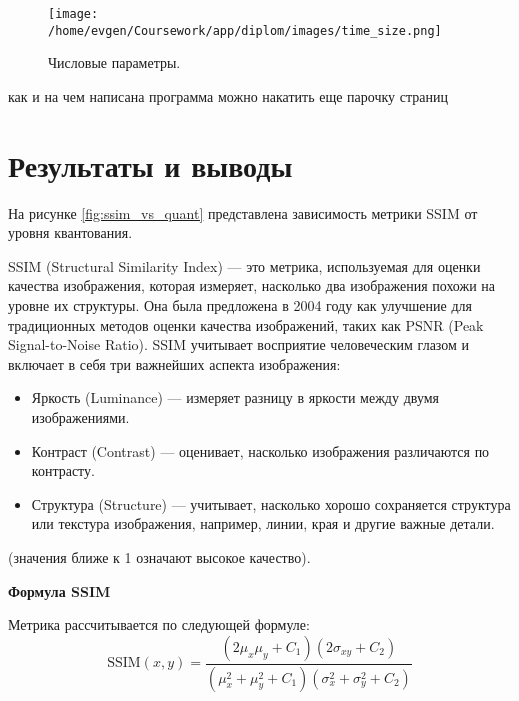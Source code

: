 \begin{figure}[h!]
    \centering
    \texttt{[image: /home/evgen/Coursework/app/diplom/images/time\_size.png]}
    \caption{Числовые параметры.}
    \label{fig:time_size}
\end{figure}

как и на чем написана программа можно накатить еще парочку страниц



\clearpage
\section{Результаты и выводы}


На рисунке \ref{fig:ssim_vs_quant} представлена зависимость метрики SSIM от уровня квантования. 

SSIM (Structural Similarity Index) — это метрика, используемая для оценки качества изображения, 
которая измеряет, насколько два изображения похожи на уровне их структуры. 
Она была предложена в 2004 году как улучшение для традиционных методов оценки качества изображений, 
таких как PSNR (Peak Signal-to-Noise Ratio). 
SSIM учитывает восприятие человеческим глазом и включает в себя три важнейших аспекта изображения:
\begin{itemize}
    \item Яркость (Luminance) — измеряет разницу в яркости между двумя изображениями.
    \item Контраст (Contrast) — оценивает, насколько изображения различаются по контрасту.
    \item Структура (Structure) — учитывает, насколько хорошо сохраняется структура или текстура изображения, например, линии, края и другие важные детали.
\end{itemize}
(значения ближе к 1 означают высокое качество).

\textbf{Формула SSIM}

Метрика рассчитывается по следующей формуле:
\begin{equation}
\text{SSIM}(x, y) = 
\frac{(2\mu_x\mu_y + C_1)(2\sigma_{xy} + C_2)}
     {(\mu_x^2 + \mu_y^2 + C_1)(\sigma_x^2 + \sigma_y^2 + C_2)}
\end{equation}


